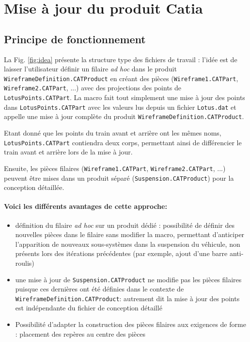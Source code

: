 \section{Mise à jour du produit Catia}
\label{majcatia}

\subsection{Principe de fonctionnement}

\par La Fig. \ref{fig:idea} présente la structure type des fichiers de travail : l'idée est de laisser l'utilisateur définir un filaire \textit{ad hoc} dans le produit \texttt{WireframeDefinition.CATProduct} en créant des pièces (\texttt{Wireframe1.CATPart}, \texttt{Wireframe2.CATPart}, ...) avec des projections des points de \texttt{LotusPoints.CATPart}. La macro fait tout simplement une mise à jour des points dans  \texttt{LotusPoints.CATPart} avec les valeurs lus depuis un fichier \texttt{Lotus.dat} et appelle une mise à jour complète du produit \texttt{WireframeDefinition.CATProduct}. 
\par Etant donné que les points du train avant et arrière ont les mêmes noms, \texttt{LotusPoints.CATPart} contiendra deux corps, permettant ainsi de différencier le train avant et arrière lors de la mise à jour.
\par Ensuite, les pièces filaires (\texttt{Wireframe1.CATPart}, \texttt{Wireframe2.CATPart}, ...) peuvent être mises dans un produit séparé (\texttt{Suspension.CATProduct}) pour la conception détaillée. 

\paragraph{Voici les différents avantages de cette approche:}

\begin{itemize}
    \item définition du filaire \textit{ad hoc} sur un produit dédié : possibilité de définir des nouvelles pièces dans le filaire sans modifier la macro, permettant d'anticiper l'apparition de nouveaux sous-systèmes dans la suspension du véhicule, non présents lors des itérations précédentes (par exemple, ajout d'une barre anti-roulis)
    \item une mise à jour de \texttt{Suspension.CATProduct} ne modifie pas les pièces filaires puisque ces dernières ont été définies dans le contexte de \texttt{WireframeDefinition.CATProduct}: autrement dit la mise à jour des points est indépendante du fichier de conception détaillé
    \item Possibilité d'adapter la construction des pièces filaires aux exigences de forme : placement des repères au centre des pièces
\end{itemize}{}

